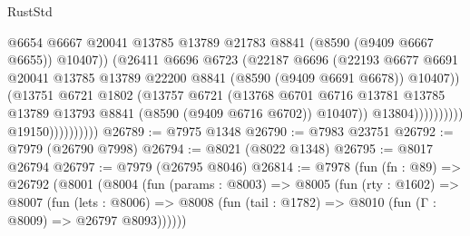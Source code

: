 \begin{lexlean}{RustStd}
\begin{coremodule}
                                            @6654
                                            @6667
                                            @20041
                                            @13785
                                            @13789
                                            @21783
                                            @8841
                                            (@8590 (@9409 @6667 @6655))
                                            @10407))
                                        (@26411
                                          @6696
                                          @6723
                                          (@22187
                                            @6696
                                            (@22193
                                              @6677
                                              @6691
                                              @20041
                                              @13785
                                              @13789
                                              @22200
                                              @8841
                                              (@8590 (@9409 @6691 @6678))
                                              @10407))
                                          (@13751
                                            @6721
                                            @1802
                                            (@13757
                                              @6721
                                              (@13768
                                                @6701
                                                @6716
                                                @13781
                                                @13785
                                                @13789
                                                @13793
                                                @8841
                                                (@8590 (@9409 @6716 @6702))
                                                @10407))
                                            @13804))))))))))
                        @19150))))))))))
@26789 := @7975 @1348
@26790 := @7983 @23751
@26792 := @7979 (@26790 @7998)
@26794 := @8021 (@8022 @1348)
@26795 := @8017 @26794
@26797 := @7979 (@26795 @8046)
@26814 := @7978
    (fun (fn : @89) =>
    @26792
      (@8001
        (@8004
          (fun (params : @8003) =>
          @8005
            (fun (rty : @1602) =>
            @8007
              (fun (lets : @8006) =>
              @8008 (fun (tail : @1782) => @8010 (fun (Γ : @8009) => @26797 @8093))))))

\end{coremodule}
\end{lexlean}
